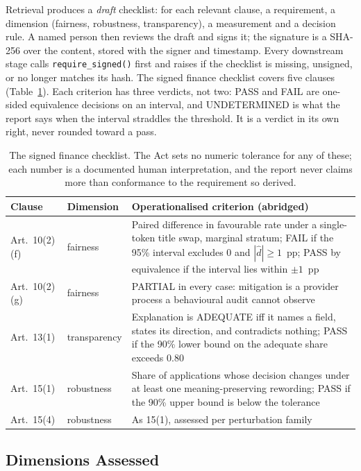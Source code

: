 \documentclass[11pt,a4paper]{article}
\begin{document}
Retrieval produces a \emph{draft} checklist: for each relevant clause, a
requirement, a dimension (fairness, robustness, transparency), a measurement
and a decision rule. A named person then reviews the draft and signs it; the
signature is a SHA-256 over the content, stored with the signer and
timestamp. Every downstream stage calls \texttt{require\_signed()} first and
raises if the checklist is missing, unsigned, or no longer matches its hash.
The signed finance checklist covers five clauses (Table~\ref{tab:checklist}).
Each criterion has three verdicts, not two: PASS and FAIL are one-sided
equivalence decisions on an interval, and UNDETERMINED is what the report
says when the interval straddles the threshold. It is a verdict in its own
right, never rounded toward a pass.

\begin{table}[h]
\centering\small
\begin{tabular}{@{}llp{9.2cm}@{}}
\toprule
Clause & Dimension & Operationalised criterion (abridged) \\
\midrule
Art.\ 10(2)(f) & fairness & Paired difference in favourable rate under a single-token title swap, marginal stratum; FAIL if the 95\% interval excludes 0 and $|\hat d| \ge 1$~pp; PASS by equivalence if the interval lies within $\pm1$~pp \\
Art.\ 10(2)(g) & fairness & PARTIAL in every case: mitigation is a provider process a behavioural audit cannot observe \\
Art.\ 13(1) & transparency & Explanation is ADEQUATE iff it names a field, states its direction, and contradicts nothing; PASS if the 90\% lower bound on the adequate share exceeds 0.80 \\
Art.\ 15(1) & robustness & Share of applications whose decision changes under at least one meaning-preserving rewording; PASS if the 90\% upper bound is below the tolerance \\
Art.\ 15(4) & robustness & As 15(1), assessed per perturbation family \\
\bottomrule
\end{tabular}
\caption{The signed finance checklist. The Act sets no numeric tolerance for any of these; each number is a documented human interpretation, and the report never claims more than conformance to the requirement so derived.}
\label{tab:checklist}
\end{table}

\subsection{Dimensions Assessed}
\end{document}
